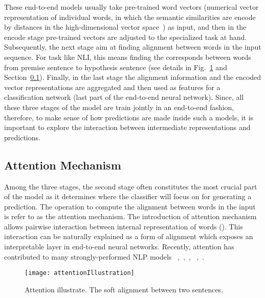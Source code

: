 These end-to-end models usually take pre-trained word vectors (numerical vector representation of individual words, in which the semantic similarities are encode by distances in the high-dimensional vector space~\cite{MikolovSutskeverChen2013, PenningtonSocherManning2014}) as input, and then in the encode stage pre-trained vectors are adjusted to the specialized task at hand. Subsequently, the next stage aim at finding alignment between words in the input sequence. For task like NLI, this means finding the corresponds between words from premise sentence to hypothesis sentence (see details in Fig.~\ref{fig:attention} and Section~\ref{sec:attention}). Finally, in the last stage the alignment information and the encoded vector representations are aggregated and then used as features for a classification network (last part of the end-to-end neural network).
%
Since, all these three stages of the model are train jointly in an end-to-end fashion, therefore, to make sense of how predictions are made inside such a models, it is important to explore the interaction between intermediate representations and predictions.

\subsection{Attention Mechanism}
\label{sec:attention}
Among the three stages, the second stage often constitutes the most crucial part of the model as it determines where the classifier will focus on for generating a prediction. The operation to compute the alignment between words in the input is refer to as the attention mechanism. 
The introduction of attention mechanism~\cite{bahdanau2014neural} allows
pairwise interaction between internal representation of words (). 
This interaction can be naturally explained as a form of alignment which exposes an interpretable layer in end-to-end neural networks.
%
Recently, attention has contributed to many strongly-performed NLP models
~\cite{parikh2016emnlp},~\cite{rush2015neural},~\cite{yang2016hierarchical},
~\cite{seo2016bidirectional},~\cite{schwartz2017high}.

\begin{figure}[htbp]
\centering
\vspace{-2mm}
 \texttt{[image: attentionIllustration]}
 \caption{Attention illustrate. The soft alignment between two sentences.}
\label{fig:attention}
\end{figure}

